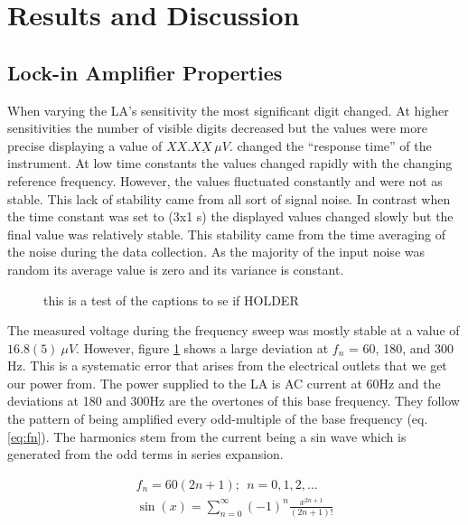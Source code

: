 \documentclass[
reprint,
amsmath,amssymb,
aps,
tikz,
border=5pt
]{revtex4-1}
\begin{document}
\section*{Results \lowercase{and} Discussion }

  \subsection*{Lock-in Amplifier Properties}

    When varying the LA's  sensitivity the most significant digit changed. At higher sensitivities the number of visible digits decreased but the values were more precise displaying a value of $XX.X\underbar{X} ~\mu V$. changed the  ``response time'' of the instrument. At low time constants the values changed rapidly with the changing reference frequency. However, the values fluctuated constantly and were not as stable. This lack of stability came from all sort of signal noise. In contrast when the time constant was set to (3x1 s) the displayed values changed slowly but the final value was relatively stable. This stability came from the time averaging of the noise during the data collection. As the majority of the input noise was random its average value is zero and its variance is constant. 


    \begin{figure}[h]
    
      \resizebox{0.45\textwidth}{!}{}
      \caption{this is a test of the captions to se if  HOLDER}
      \label{fig:freq_dep}
  
    \end{figure}

    The measured voltage during the frequency sweep was mostly stable at a value of $16.8(5) ~\mu V$. However, figure \ref{fig:freq_dep} shows a large deviation at $f_n$ = 60, 180, and 300 Hz. This is a systematic error that arises from the electrical outlets that we get our power from. The power supplied to the LA is AC current at 60Hz and the deviations at 180 and 300Hz are the overtones of this base frequency.\cite{harmonics} They follow the pattern of being amplified every odd-multiple of the base frequency (eq. \ref{eq:fn}). The harmonics stem from the current being a sin wave which is generated from the odd terms in series expansion.
    
    \begin{gather}
      f_n = 60(2n+1); ~~{n = 0, 1, 2, \dots}
      \label{eq:fn} \\
      \sin(x) = \sum_{n=0}^{\infty} \left(-1\right)^n \frac{x^{2n +1}}{(2n+1)!} \label{eq:sin_taylor}
    \end{gather}
    
\end{document}
